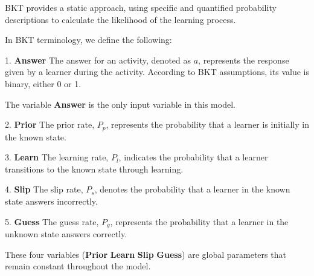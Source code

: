 \documentclass{article}
\begin{document}
\begin{center}
\end{center}

BKT provides a static approach, using specific and quantified probability descriptions to calculate the likelihood of the learning process.

In BKT terminology, we define the following:

1. \textbf{Answer}  
The answer for an activity, denoted as \( a \), represents the response given by a learner during the activity. According to BKT assumptions, its value is binary, either 0 or 1.

The variable \textbf{Answer} is the only input variable in this model.

2. \textbf{Prior}  
The prior rate, \( P_p \), represents the probability that a learner is initially in the known state.

3. \textbf{Learn}  
The learning rate, \( P_l \), indicates the probability that a learner transitions to the known state through learning.

4. \textbf{Slip}  
The slip rate, \( P_s \), denotes the probability that a learner in the known state answers incorrectly.

5. \textbf{Guess}  
The guess rate, \( P_g \), represents the probability that a learner in the unknown state answers correctly.

These four variables (\textbf{Prior} \textbf{Learn} \textbf{Slip} \textbf{Guess}) are global parameters that remain constant throughout the model.
\end{document}

